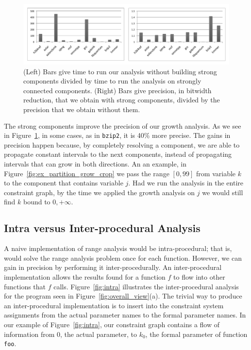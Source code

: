 \documentclass{paper}
\begin{document}
\begin{figure}[t!]
\begin{center}
\includegraphics[width=\textwidth]{images/impactSCC}
\end{center}
\caption{\label{fig:impactSCC}
(Left) Bars give time to run our analysis without building strong components
divided by time to run the analysis on strongly connected components.
(Right) Bars give precision, in bitwidth reduction, that we obtain with strong
components, divided by the precision that we obtain without them.
}
\end{figure}

The strong components improve the precision of our growth analysis.
As we see in Figure~\ref{fig:impactSCC}, in some cases, as in \texttt{bzip2},
it is 40\% more precise.
The gains in precision happen because, by completely resolving a component,
we are able to propagate constant intervals to the next components, instead
of propagating intervals that can grow in both directions.
An an example, in Figure~\ref{fig:ex_partition_grow_crop} we pass the range
$[0, 99]$ from variable $k$ to the component that contains variable $j$.
Had we run the analysis in the entire constraint graph, by the time we
applied the growth analysis on $j$ we would still find $k$ bound to
$0, +\infty$.

\subsection{Intra versus Inter-procedural Analysis}
\label{sub:whole}

A naive implementation of range analysis would be intra-procedural; that is,
would solve the range analysis problem once for each function.
However, we can gain in precision by performing it inter-procedurally.
An inter-procedural implementation allows the results found for a function $f$
to flow into other functions that $f$ calls.
Figure~\ref{fig:intra} illustrates the inter-procedural analysis for the
program seen in Figure~\ref{fig:overall_view}(a).
The trivial way to produce an inter-procedural implementation is to insert
into the constraint system assignments from the actual parameter names to the
formal parameter names.
In our example of Figure~\ref{fig:intra}, our constraint graph contains a flow
of information from $0$, the actual parameter, to $k_0$, the formal parameter
of function \texttt{foo}.
\end{document}

